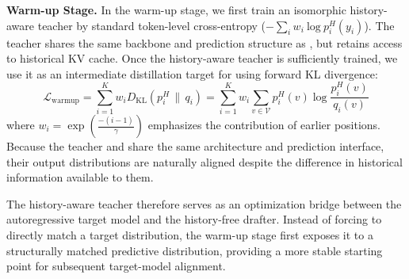 \textbf{Warm-up Stage.} In the warm-up stage, we first train an isomorphic history-aware teacher by standard token-level cross-entropy (\(-\sum_i w_i \ \mathrm{log}\ {p_i^H(y_i)}\)). The teacher shares the same backbone and prediction structure as \we, but retains access to historical KV cache. 
Once the history-aware teacher is sufficiently trained, we use it as an intermediate distillation target for \we using forward KL divergence: 
\begin{equation}
\mathcal{L}_{\mathrm{warmup}}
=
\sum_{i=1}^{K}
w_i D_{\mathrm{KL}}
\left(
p_i^{H}\,\|\,q_i
\right)
=
\sum_{i=1}^{K}
w_i
\sum_{v\in\mathcal V}
p_i^{H}(v)
\log
\frac{p_i^{H}(v)}
{q_i(v)}
\end{equation}
where \(w_i = \exp(\frac{-(i-1)}{\gamma})\) emphasizes the contribution of earlier positions. Because the teacher and \we share the same architecture and prediction interface, their output distributions are naturally aligned despite the difference in historical information available to them.

The history-aware teacher therefore serves as an optimization bridge between the autoregressive target model and the history-free drafter. Instead of forcing \we to directly match a target distribution, the warm-up stage first exposes it to a structurally matched predictive distribution, providing a more stable starting point for subsequent target-model alignment.




